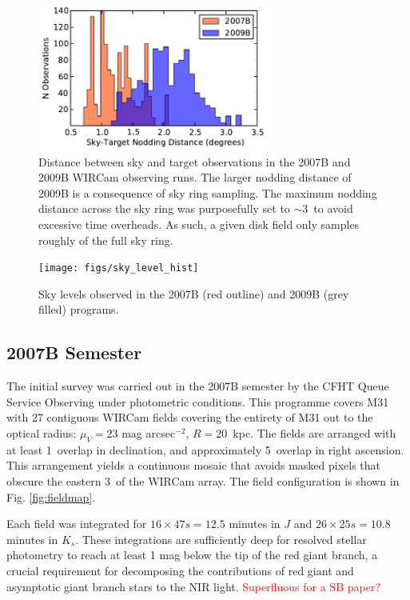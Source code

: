 \documentclass[iop]{emulateapj}
\newcommand{\changeit}[1]{\textcolor{red}{#1}} %
\begin{document}
\begin{figure}[t]
    \centering
        \includegraphics[width=3in]{figs/sky_target_dist}
    \caption{Distance between sky and target observations in the 2007B and 2009B WIRCam observing runs. The larger nodding distance of 2009B is a consequence of sky ring sampling. The maximum nodding distance across the sky ring was purposefully set to $\sim 3$\arcdeg\ to avoid excessive time overheads. As such, a given disk field only samples roughly of the full sky ring.}
    \label{fig:sky_target_dist}
\end{figure}

\begin{figure}[t]
    \centering
        \texttt{[image: figs/sky\_level\_hist]}
    \caption{Sky levels observed in the 2007B (red outline) and 2009B (grey filled) programs.}
    \label{fig:net_sky_level}
\end{figure}

\subsection{2007B Semester} %
\label{sec:obs7}

The initial survey was carried out in the 2007B semester by the CFHT Queue Service Observing under photometric conditions. This programme covers M31 with 27 contiguous WIRCam fields covering the entirety of M31 out to the optical radius: $\mu_V=23$ mag arcsec$^{-2}$, $R=20$~kpc. The fields are arranged with at least 1\arcmin\ overlap in declination, and approximately 5\arcmin\ overlap in right ascension.
This arrangement yields a continuous mosaic that avoids masked pixels that obscure the eastern 3\arcmin\ of the WIRCam array. The field configuration is shown in Fig. \ref{fig:fieldmap}.

Each field was integrated for $16\times 47 s = 12.5$ minutes in $J$ and $26\times 25 s = 10.8$ minutes in $K_s$. These integrations are sufficiently deep for resolved stellar photometry to reach at least 1 mag below the tip of the red giant branch, a crucial requirement for decomposing the contributions of red giant and asymptotic giant branch stars to the NIR light. \changeit{Superfluous for a SB paper?}
\end{document}
